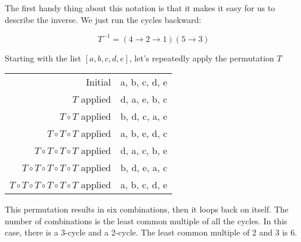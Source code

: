 The first handy thing about this notation is that it makes it easy for
us to describe the inverse. We just run the cycles backward:

$$T^{-1} = (4 \rightarrow 2 \rightarrow 1)(5 \rightarrow 3)$$

Starting with the list $[a, b, c, d, e]$, let's repeatedly apply the permutation $T$

\begin{tabular}{r | l}
  Initial & {\color{red} a, b,} {\color{blue} c,} {\color{red} d,} {\color{blue} e} \\ 
  $T$ applied & {\color{red} d, a,}  {\color{blue} e,} {\color{red} b,} {\color{blue} c}\\
  $T \circ T$ applied & {\color{red} b, d,} {\color{blue} c,} {\color{red} a,}  {\color{blue} e} \\
  $T \circ T \circ T$ applied & {\color{red} a, b,}  {\color{blue} e,} {\color{red} d,} {\color{blue} c} \\
  $T \circ T \circ T \circ T$ applied & {\color{red} d, a,} {\color{blue} c,} {\color{red}b,}  {\color{blue} e} \\
  $T \circ T \circ T \circ T \circ T$ applied & {\color{red} b, d,}  {\color{blue} e,} {\color{red} a,} {\color{blue} c} \\
  $T \circ T \circ T \circ T \circ T \circ T$ applied & {\color{red} a, b,} {\color{blue} c,} {\color{red} d,}  {\color{blue} e}\\
\end{tabular}

This permutation results in six combinations, then it loops back
on itself. The number of combinations is the least common multiple of
all the cycles.  In this case, there is a 3-cycle and a 2-cycle. The
least common multiple of 2 and 3 is 6.

